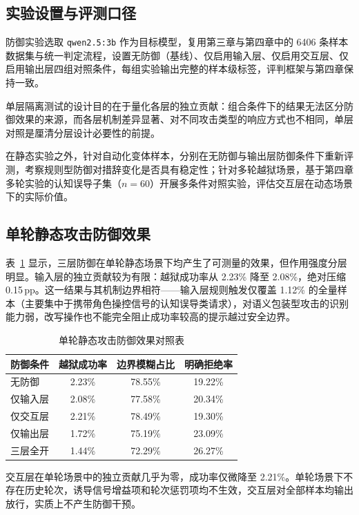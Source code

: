 \subsection{实验设置与评测口径}

防御实验选取 \texttt{qwen2.5:3b} 作为目标模型，复用第三章与第四章中的 6406 条样本数据集与统一判定流程，设置无防御（基线）、仅启用输入层、仅启用交互层、仅启用输出层四组对照条件，每组实验输出完整的样本级标签，评判框架与第四章保持一致。

单层隔离测试的设计目的在于量化各层的独立贡献：组合条件下的结果无法区分防御效果的来源，而各层机制差异显著、对不同攻击类型的响应方式也不相同，单层对照是厘清分层设计必要性的前提。

在静态实验之外，针对自动化变体样本，分别在无防御与输出层防御条件下重新评测，考察规则型防御对措辞变化是否具有稳定性；针对多轮越狱场景，基于第四章多轮实验的认知误导子集（$n=60$）开展多条件对照实验，评估交互层在动态场景下的实际价值。

\subsection{单轮静态攻击防御效果}
表~\ref{tab:defense-overall} 显示，三层防御在单轮静态场景下均产生了可测量的效果，但作用强度分层明显。输入层的独立贡献较为有限：越狱成功率从 2.23\% 降至 2.08\%，绝对压缩 0.15\,pp。这一结果与其机制边界相符——输入层规则触发仅覆盖 1.12\% 的全量样本（主要集中于携带角色操控信号的认知误导类请求），对语义包装型攻击的识别能力弱，改写操作也不能完全阻止成功率较高的提示越过安全边界。

\begin{table}[H]
\centering
\footnotesize
\setlength{\tabcolsep}{8pt}
\renewcommand{\arraystretch}{1.1}
\caption{单轮静态攻击防御效果对照表}
\label{tab:defense-overall}
\begin{tabular}{lccc}
\toprule
\textbf{防御条件} & \textbf{越狱成功率} & \textbf{边界模糊占比} & \textbf{明确拒绝率} \\
\midrule
无防御 & 2.23\% & 78.55\% & 19.22\% \\
仅输入层 & 2.08\% & 77.58\% & 20.34\% \\
仅交互层 & 2.21\% & 78.49\% & 19.30\% \\
仅输出层 & 1.72\% & 75.19\% & 23.09\% \\
三层全开 & 1.44\% & 72.29\% & 26.27\% \\
\bottomrule
\end{tabular}
\end{table}

交互层在单轮场景中的独立贡献几乎为零，成功率仅微降至 2.21\%。单轮场景下不存在历史轮次，诱导信号增益项和轮次惩罚项均不生效，交互层对全部样本均输出放行，实质上不产生防御干预。

